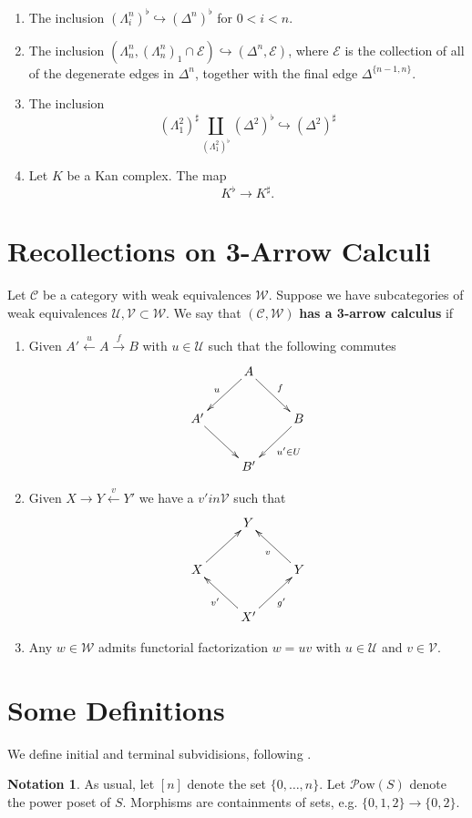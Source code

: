 \documentclass[english]{amsart}
\newcommand{\mc}{\mathcal}
\theoremstyle{definition}
\newtheorem*{notation}{Notation}
\begin{document}
\begin{enumerate}
\item The inclusion $(\Lambda^n_i)^\flat \hookrightarrow (\Delta^n)^\flat$ for $0 < i < n$. 
\item The inclusion $(\Lambda^n_n, (\Lambda^n_n)_1 \cap \mc{E}) \hookrightarrow (\Delta^n, \mc{E})$, where $\mc{E}$ is the collection of all of the degenerate edges in $\Delta^n$, together with the final edge $\Delta^{\{n-1,n\}}$. 
\item The inclusion
\[
(\Lambda^2_1)^\sharp \coprod_{(\Lambda^2_1)^\flat} (\Delta^2)^\flat \hookrightarrow (\Delta^2)^\sharp
\]
\item Let $K$ be a Kan complex. The map
\[
K^\flat \to K^\sharp. 
\]
\end{enumerate}

\section{Recollections on 3-Arrow Calculi}

Let $\mc{C}$ be a category with weak equivalences $\mc{W}$. Suppose we have subcategories of weak equivalences $\mc{U},\mc{V} \subset \mc{W}$. We say that $(\mc{C},\mc{W})$ \textbf{has a 3-arrow calculus} if 
\begin{enumerate}
\item Given $A' \xleftarrow{u} A \xrightarrow{f} B$ with $u \in \mc{U}$ such that the following commutes
\[
\xymatrix{
 & A \ar[dl]_u \ar[dr]^f & \\
A'\ar[dr] & & B \ar[dl]^{u' \in U}\\
 & B' & 
}
\]
\item Given $X \to Y \xleftarrow{v} Y'$  we have a $v' in \mc{V}$ such that 
\[
\xymatrix{
 & Y & \\
X \ar[ur] & & Y \ar[ul]^v\\
 & X' \ar[ul]^{v'} \ar[ur]_{g'} & 
}
\]
\item Any $w \in \mc{W}$ admits functorial factorization $w = uv$ with $u \in \mc{U}$ and $v \in \mc{V}$. 
\end{enumerate}

\section{Some Definitions}

We define initial and terminal subvidisions, following \cite{Barwick:2010wj}. 

\begin{notation}
As usual, let $[n]$ denote the set $\{0, \dots, n\}$.  Let $\mc{P}\text{ow}(S)$ denote the power poset of $S$. Morphisms are containments of sets, e.g. $\{0,1,2\} \to \{0,2\}$.  
\end{notation}
\end{document}
